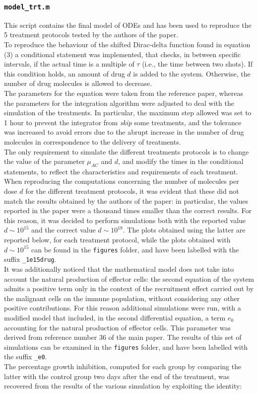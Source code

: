 \subsubsection{\texttt{model\_trt.m}}
This script contains the final model of ODEs and has been used to reproduce the 5 treatment protocols tested by the authors of the paper. \\
To reproduce the behaviour of the shifted Dirac-delta function found in equation (3) a conditional statement was implemented, that checks, in between specific intervals, if the actual time is a multiple of $\tau$ (i.e., the time between two shots). If this condition holds, an amount of drug $d$ is added to the system. Otherwise, the number of drug molecules is allowed to decrease.\\
The parameters for the equation were taken from the reference paper, whereas the parameters for the integration algorithm were adjusted to deal with the simulation of the treatments. In particular, the maximum step allowed was set to 1 hour to prevent the integrator from \textit{skip} some treatments, and the tolerance was increased to avoid errors due to the abrupt increase in the number of drug molecules in correspondence to the delivery of treatments.\\
The only requirement to simulate the different treatments protocols is to change the value of the parameter $\mu_{AC}$ and $d$, and modify the times in the conditional statements, to reflect the characteristics and requirements of each treatment. \\
When reproducing the computations concerning the number of molecules per dose $d$ for the different treatment protocols, it was evident that these did not match the results obtained by the authors of the paper: in particular, the values reported in the paper were a thousand times smaller than the correct results. For this reason, it was decided to perform simulations both with the reported value $d \sim 10^{15}$ and the correct value $d \sim 10^{18}$. The plots obtained using the latter are reported below, for each treatment protocol, while the plots obtained with $d \sim 10^{15}$ can be found in the \texttt{figures} folder, and have been labelled with the suffix \texttt{\_1e15drug}. \\
It was additionally noticed that the mathematical model does not take into account the natural production of effector cells: the second equation of the system admits a positive term only in the context of the recruitment effect carried out by the malignant cells on the immune population, without considering any other positive contributions. For this reason additional simulations were run, with a modified model that included, in the second differential equation, a term $e_0$ accounting for the natural production of effector cells. This parameter was derived from reference number 36 of the main paper. The results of this set of simulations can be examined in the \texttt{figures} folder, and have been labelled with the suffix \texttt{\_e0}.\\
The percentage growth inhibition, computed for each group by comparing the latter with the control group two days after the end of the treatment, was recovered from the results of the various simulation by exploiting the identity:

